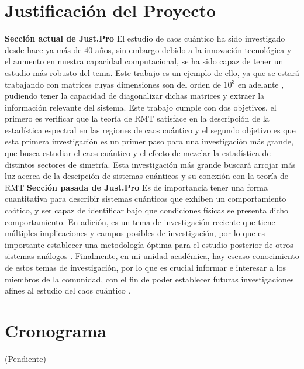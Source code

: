 \documentclass[spanish,titlepage,table]{practicas}
\begin{document}
\section{Justificación del Proyecto}
\textbf{Sección actual de Just.Pro}
\newline
El estudio de caos cuántico ha sido investigado desde hace ya más de 40 años, sin embargo debido a la innovación tecnológica y el aumento en nuestra capacidad 
computacional, se ha sido capaz de tener un estudio más robusto del tema. Este trabajo es un ejemplo de ello, ya que 
se estará trabajando con matrices cuyas dimensiones son del orden de $10^{3}$ en adelante \cite{Zhang2010}, 
pudiendo tener la capacidad de diagonalizar dichas matrices y extraer la información relevante del sistema.
Este trabajo cumple con dos objetivos, el primero es verificar que la teoría de RMT satisface en la descripción de la 
estadística espectral en las regiones de caos cuántico y el segundo objetivo es que esta primera investigación es 
un primer paso para una investigación más grande, que busca estudiar el caos cuántico y el efecto de mezclar la estadística 
de distintos sectores de simetría. Esta investigación más grande buscará arrojar más luz acerca de la descipción de sistemas cuánticos y su conexión con la teoría de RMT
\newline
\textbf{Sección pasada de Just.Pro}
Es de importancia tener una forma cuantitativa para describir sistemas cuánticos que exhiben 
un comportamiento caótico, y ser capaz de identificar bajo que condiciones físicas se presenta 
dicho comportamiento. En adición, es un tema de investigación reciente que tiene múltiples implicaciones 
y campos posibles de investigación, por lo que es importante establecer una metodología óptima para el estudio posterior de otros sistemas análogos .
Finalmente, en mi unidad académica, hay escaso conocimiento de estos temas de investigación, por lo que 
es crucial informar e interesar a los miembros de la comunidad, con el fin de poder establecer 
futuras investigaciones afines al estudio del caos cuántico . 
\section{Cronograma}
(Pendiente)


\end{document}
